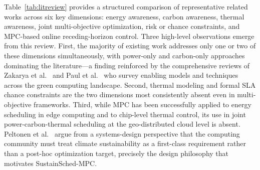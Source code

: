 \documentclass[a4paper,fleqn]{cas-dc}
\begin{document}
Table~\ref{tab:litreview} provides a structured comparison of representative related works across six key dimensions: energy awareness, carbon awareness, thermal awareness, joint multi-objective optimization, risk or chance constraints, and MPC-based online receding-horizon control. Three high-level observations emerge from this review. First, the majority of existing work addresses only one or two of these dimensions simultaneously, with power-only and carbon-only approaches dominating the literature---a finding reinforced by the comprehensive reviews of Zakarya et al.~\cite{ref-zakarya24review} and Paul et al.~\cite{ref-paul23review} who survey enabling models and techniques across the green computing landscape. Second, thermal modeling and formal SLA chance constraints are the two dimensions most consistently absent even in multi-objective frameworks. Third, while MPC has been successfully applied to energy scheduling in edge computing and to chip-level thermal control, its use in joint power-carbon-thermal scheduling at the geo-distributed cloud level is absent. Peltonen et al.~\cite{ref-peltonen25} argue from a systems-design perspective that the computing community must treat climate sustainability as a first-class requirement rather than a post-hoc optimization target, precisely the design philosophy that motivates SustainSched-MPC.
\end{document}
